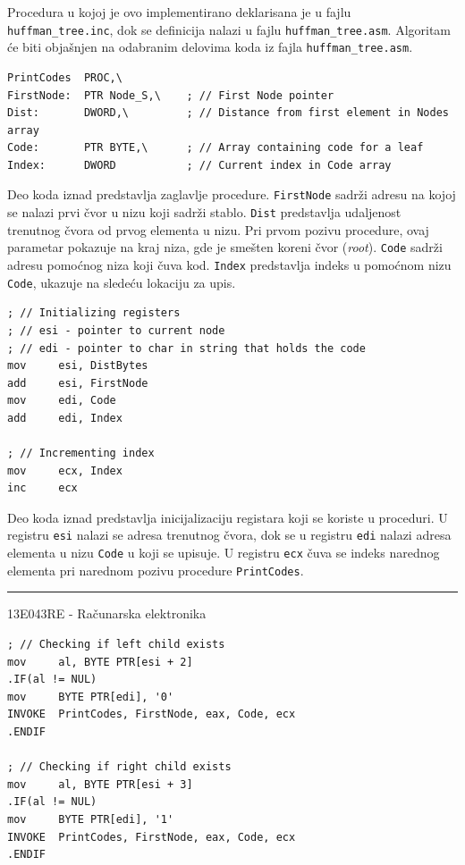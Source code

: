 \documentclass[a4paper, 12pt]{article}
\newcommand{\btmline}{
\vfill
\rule{0.9\textwidth}{0.4mm}
\begin{center}
13E043RE - Računarska elektronika
\end{center}}
\begin{document}
Procedura u kojoj je ovo implementirano deklarisana je u fajlu \verb|huffman_tree.inc|, dok se definicija nalazi u fajlu \verb|huffman_tree.asm|.
Algoritam će biti objašnjen na odabranim delovima koda iz fajla \verb|huffman_tree.asm|.

\vspace{3cm}

\begin{verbatim}
PrintCodes	PROC,\
FirstNode:	PTR Node_S,\	; // First Node pointer 
Dist:		DWORD,\			; // Distance from first element in Nodes array
Code:		PTR BYTE,\		; // Array containing code for a leaf
Index:		DWORD			; // Current index in Code array 
\end{verbatim}

Deo koda iznad predstavlja zaglavlje procedure. \verb|FirstNode| sadrži adresu na kojoj se nalazi prvi čvor u nizu koji sadrži stablo. \verb|Dist| predstavlja udaljenost trenutnog čvora od prvog elementa u nizu. Pri prvom pozivu procedure, ovaj parametar pokazuje na kraj niza, gde je smešten koreni čvor (\textit{root}). \verb|Code| sadrži adresu pomoćnog niza koji čuva kod. \verb|Index| predstavlja indeks u pomoćnom nizu \verb|Code|, ukazuje na sledeću lokaciju za upis.

\vspace{2cm}

\begin{verbatim}
; // Initializing registers
; // esi - pointer to current node
; // edi - pointer to char in string that holds the code
mov		esi, DistBytes
add		esi, FirstNode
mov		edi, Code
add		edi, Index

; // Incrementing index
mov		ecx, Index
inc		ecx
\end{verbatim}

Deo koda iznad predstavlja inicijalizaciju registara koji se koriste u proceduri. U registru \verb|esi| nalazi se adresa trenutnog čvora, dok se u registru \verb|edi| nalazi adresa elementa u nizu \verb|Code| u koji se upisuje. U registru \verb|ecx| čuva se indeks narednog elementa pri narednom pozivu procedure \verb|PrintCodes|.

\btmline\newpage

\begin{verbatim}
; // Checking if left child exists
mov		al, BYTE PTR[esi + 2]
.IF(al != NUL)
mov		BYTE PTR[edi], '0'
INVOKE	PrintCodes, FirstNode, eax, Code, ecx
.ENDIF

; // Checking if right child exists
mov		al, BYTE PTR[esi + 3]
.IF(al != NUL)
mov		BYTE PTR[edi], '1'
INVOKE	PrintCodes, FirstNode, eax, Code, ecx
.ENDIF
\end{verbatim}
\end{document}
